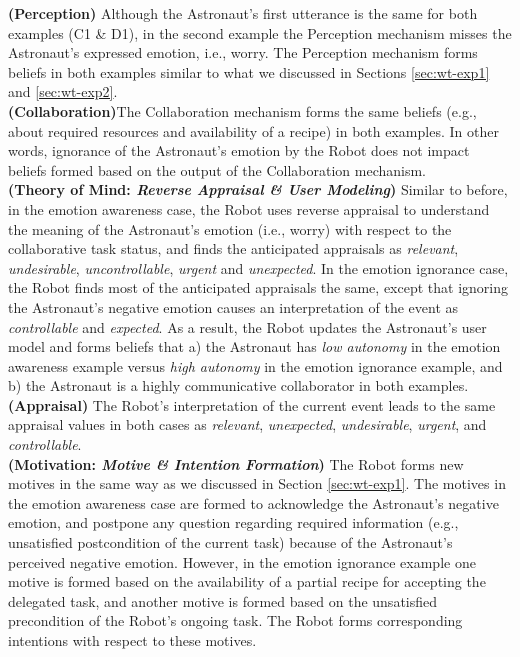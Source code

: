 \noindent\textbf{(Perception)} Although the Astronaut's first utterance is the
same for both examples (C1 \& D1), in the second example the Perception
mechanism misses the Astronaut's expressed emotion, i.e., worry. The Perception
mechanism forms beliefs in both examples similar to what we discussed in
Sections \ref{sec:wt-exp1} and \ref{sec:wt-exp2}.\\

\noindent\textbf{(Collaboration)}The Collaboration mechanism forms the same
beliefs (e.g., about required resources and availability of a recipe) in both
examples. In other words, ignorance of the Astronaut's emotion by the Robot does
not impact beliefs formed based on the output of the Collaboration mechanism.\\

\noindent\textbf{(Theory of Mind: \textit{Reverse Appraisal \& User Modeling})}
Similar to before, in the emotion awareness case, the Robot uses reverse
appraisal to understand the meaning of the Astronaut's emotion (i.e., worry)
with respect to the collaborative task status, and finds the anticipated
appraisals as \textit{relevant}, \textit{undesirable}, \textit{uncontrollable},
\textit{urgent} and \textit{unexpected}. In the emotion ignorance case, the
Robot finds most of the anticipated appraisals the same, except that ignoring
the Astronaut's negative emotion causes an interpretation of the event as
\textit{controllable} and \textit{expected}. As a result, the Robot updates the
Astronaut's user model and forms beliefs that a) the Astronaut has \textit{low
autonomy} in the emotion awareness example versus \textit{high autonomy} in the
emotion ignorance example, and b) the Astronaut is a highly communicative
collaborator in both examples.\\

\noindent\textbf{(Appraisal)} The Robot's interpretation of the current event
leads to the same appraisal values in both cases as \textit{relevant},
\textit{unexpected}, \textit{undesirable}, \textit{urgent}, and
\textit{controllable}.\\

\noindent \textbf{(Motivation: \textit{Motive \& Intention Formation})}
The Robot forms new motives in the same way as we discussed in Section
\ref{sec:wt-exp1}. The motives in the emotion awareness case are
formed to acknowledge the Astronaut's negative emotion, and postpone any
question regarding required information (e.g., unsatisfied postcondition of the
current task) because of the Astronaut's perceived negative emotion. However, in
the emotion ignorance example one motive is formed based on the availability of
a partial recipe for accepting the delegated task, and another motive is formed
based on the unsatisfied precondition of the Robot's ongoing task. The Robot
forms corresponding intentions with respect to these motives.\\

